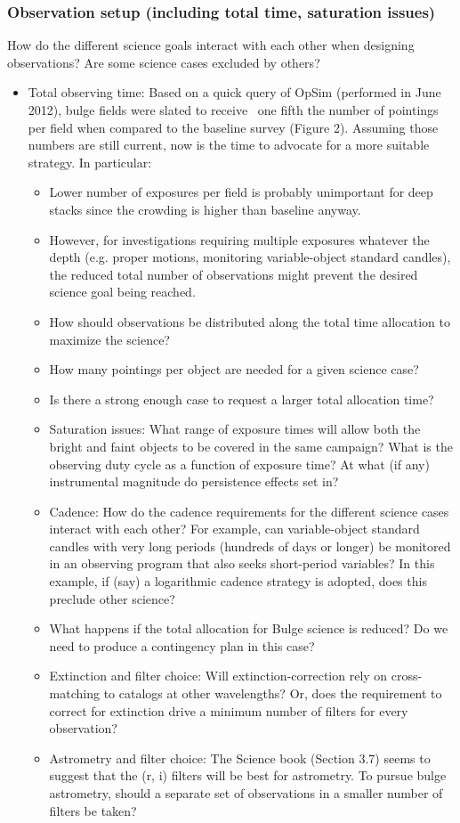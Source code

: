 \subsubsection{Observation setup (including total time, saturation issues)}
How do the different science goals interact with each other when designing observations? Are some science cases excluded by others? 

\begin{itemize}
\item{Total observing time: Based on a quick query of OpSim (performed in June 2012), bulge fields were slated to receive ~one fifth the number of pointings per field when compared to the baseline survey (Figure 2). Assuming those numbers are still current, now is the time to advocate for a more suitable strategy. In particular: 

\begin{itemize}
\item{Lower number of exposures per field is probably unimportant for deep stacks since the crowding is higher than baseline anyway. }
\item{ However, for investigations requiring multiple exposures whatever the depth (e.g. proper motions, monitoring variable-object standard candles), the reduced total number of observations might prevent the desired science goal being reached. }
\item How should observations be distributed along the total time allocation to maximize the science? 
\item How many pointings per object are needed for a given science case? 
\item Is there a strong enough case to request a larger total allocation time? 
\item{Saturation issues: What range of exposure times will allow both the bright and faint objects to be 
covered in the same campaign? What is the observing duty cycle as a function of exposure time? At what 
(if any) instrumental magnitude do persistence effects set in? }
\item{
Cadence: How do the cadence requirements for the different science cases interact with each other? For 
example, can variable-object standard candles with very long periods (hundreds of days or longer) be monitored in an observing program that also seeks short-period variables? In this example, if (say) a logarithmic cadence strategy is adopted, does this preclude other science? }
\item{What happens if the total allocation for Bulge science is reduced? Do we need to produce a contingency plan in this case? }
\item{Extinction and filter choice: Will extinction-correction rely on cross-matching to catalogs at other wavelengths? Or, does the requirement to correct for extinction drive a minimum number of filters for every observation? }
\item{Astrometry and filter choice: The Science book (Section 3.7) seems to suggest that the (r, i) filters will be best for astrometry. To pursue bulge astrometry, should a separate set of observations in a smaller number of filters be taken? }
\end{itemize}
}
\end{itemize}

